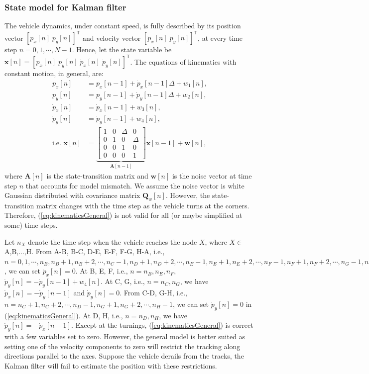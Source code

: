\documentclass[11pt]{article}
\newcommand{\bx}{\mathbf{x}}
\newcommand{\bw}{\mathbf{w}}
\newcommand{\bA}{\mathbf{A}}
\newcommand{\bQ}{\mathbf{Q}}
\newcommand{\TT}{\mathsf{T}}
\begin{document}
\subsubsection{State model for Kalman filter}
\label{subsubsec:stateModel}

The vehicle dynamics, under constant speed, is fully described by its position vector $[p_{x}[n] \; p_{y}[n]]^{\TT}$ and velocity vector $[\dot{p}_{x}[n] \; \dot{p}_{y}[n]]^{\TT}$, at every time step $n=0,1,\cdots,N-1$. Hence, let the state variable be $\bx[n] = [p_{x}[n] \; p_{y}[n] \; \dot{p}_{x}[n] \; \dot{p}_{y}[n]]^{\TT}$. The equations of kinematics with constant motion, in general, are:
\begin{equation}
\begin{split}
	p_{x}[n] &= p_{x}[n-1] + \dot{p}_{x}[n-1] \Delta + w_{1}[n], \\
	p_{y}[n] &= p_{y}[n-1] + \dot{p}_{y}[n-1] \Delta + w_{2}[n], \\
	\dot{p}_{x}[n] &= \dot{p}_{x}[n-1] + w_{3}[n], \\
	\dot{p}_{y}[n] &= \dot{p}_{y}[n-1] + w_{4}[n], \\
	\text{i.e. }
	\bx[n] &= \underbrace{\begin{bmatrix}
		1 & 0 & \Delta & 0 \\
		0 & 1 & 0 & \Delta \\
		0 & 0 & 1 & 0 \\
		0 & 0 & 0 & 1
	\end{bmatrix}}_{\bA[n-1]} \bx[n-1] + \bw[n],
\end{split}
\label{eq:kinematicsGeneral}
\end{equation}
where $\bA[n]$ is the state-transition matrix and $\bw[n]$ is the noise vector at time step $n$ that accounts for model mismatch. We assume the noise vector is white Gaussian distributed with covariance matrix $\bQ_{w}[n]$. However, the state-transition matrix changes with the time step as the vehicle turns at the corners. Therefore, (\ref{eq:kinematicsGeneral}) is not valid for all (or maybe simplified at some) time steps.

Let $n_{X}$ denote the time step when the vehicle reaches the node $X$, where $X\in$ A,B,...,H. From A-B, B-C, D-E, E-F, F-G, H-A, i.e., $n=0,1,\cdots,n_{B}, n_{B}+1,n_{B}+2,\cdots,n_{C}-1, n_{D}+1,n_{D}+2,\cdots,n_{E}-1, n_{E}+1,n_{E}+2,\cdots,n_{F}-1, n_{F}+1,n_{F}+2,\cdots,n_{G}-1, n_{H}+1,n_{H}+2,\cdots,N-1$, we can set $\dot{p}_{x}[n] = 0$. At B, E, F, i.e., $n=n_{B}, n_{E}, n_{F}$, $\dot{p}_{y}[n] = -\dot{p}_{y}[n-1] + w_{4}[n]$. At C, G, i.e., $n=n_{C},n_{G}$, we have $\dot{p}_{x}[n] = -\dot{p}_{y}[n-1]$ and $\dot{p}_{y}[n] = 0$. From C-D, G-H, i.e., $n=n_{C}+1,n_{C}+2,\cdots,n_{D}-1, n_{G}+1,n_{G}+2,\cdots,n_{H}-1$, we can set $\dot{p}_{y}[n] = 0$ in (\ref{eq:kinematicsGeneral}). At D, H, i.e., $n=n_{D}, n_{H}$, we have $\dot{p}_{y}[n] = -\dot{p}_{x}[n-1]$. Except at the turnings, (\ref{eq:kinematicsGeneral}) is correct with a few variables set to zero. However, the general model is better suited as setting one of the velocity components to zero will restrict the tracking along directions parallel to the axes. Suppose the vehicle derails from the tracks, the Kalman filter will fail to estimate the position with these restrictions.
\end{document}
